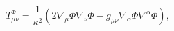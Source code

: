 \begin{equation}\label{etmnp}
T^{\Phi}_{\mu\nu}=\frac{1}{\kappa^{2}}\left(2\nabla_\mu\Phi\nabla_\nu\Phi
-g_{\mu\nu}\nabla_\alpha\Phi\nabla^\alpha\Phi\right),
\end{equation}

